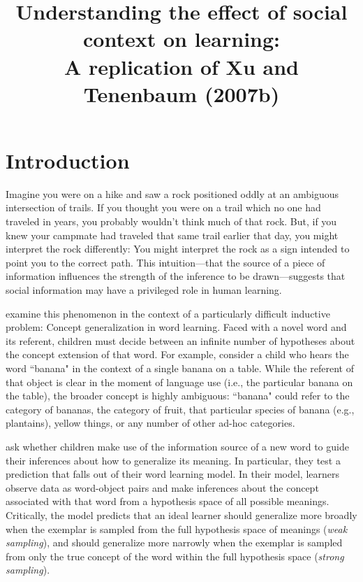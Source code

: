 \documentclass[man]{apa2}
\title{Understanding the effect of social context on learning: \\ A replication of Xu and Tenenbaum (2007b)}
\begin{document}
\maketitle              


\section{Introduction}
Imagine you were on a hike and saw a rock positioned oddly at an ambiguous intersection of trails.  If you thought you were on a trail  which no one had traveled in years, you probably wouldn't think much of that rock. But, if you knew your  campmate had traveled that same trail earlier that day, you might interpret the rock differently: You might interpret the rock as a sign intended to point you to the correct path. This intuition---that the  source of a piece of information influences the strength of the inference to be drawn---suggests that social information may have a privileged role in human learning.

 examine this phenomenon in the context of a particularly difficult inductive problem: Concept generalization in word learning. Faced with a novel word and its referent, children must decide between an infinite number of hypotheses about the concept extension of that word. For example, consider a child who hears the word  ``banana" in the context of a single banana on a table. While the referent of that object is clear in the moment of language use (i.e., the particular banana on the table), the broader concept is highly ambiguous: ``banana" could refer to the category of bananas, the category of fruit, that particular species of banana (e.g., plantains), yellow things, or any number of other ad-hoc categories. 

 ask whether children make use of the information source of a new word to guide their inferences about how to generalize its meaning. In particular, they test a prediction that falls out of their word learning model. In their model, learners observe data as word-object pairs and make inferences about the concept associated with that word from a hypothesis space of all possible meanings. Critically, the model predicts that  an ideal  learner should generalize more broadly when the exemplar is sampled from the full hypothesis space of meanings ({\it weak sampling}), and should generalize more narrowly when the exemplar is sampled from only  the true concept of the word within the full hypothesis space ({\it strong sampling}). 
\end{document}
